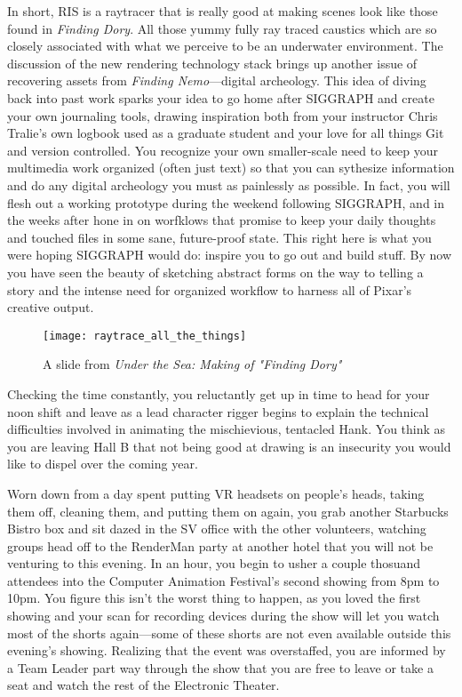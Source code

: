 \documentclass[../main.tex]{subfiles}
\begin{document}
In short, RIS is a raytracer that is really good at making scenes look like those found in \textit{Finding Dory}. All those yummy fully ray traced caustics which are so closely associated with what we perceive to be an underwater environment. The discussion of the new rendering technology stack brings up another issue of recovering assets from \textit{Finding Nemo}---digital archeology. This idea of diving back into past work sparks your idea to go home after SIGGRAPH and create your own journaling tools, drawing inspiration both from your instructor Chris Tralie's own logbook used as a graduate student and your love for all things Git and version controlled. You recognize your own smaller-scale need to keep your multimedia work organized (often just text) so that you can sythesize information and do any digital archeology you must as painlessly as possible. In fact, you will flesh out a working prototype during the weekend following SIGGRAPH, and in the weeks after hone in on worfklows that promise to keep your daily thoughts and touched files in some sane, future-proof state. This right here is what you were hoping SIGGRAPH would do: inspire you to go out and build stuff. By now you have seen the beauty of sketching abstract forms on the way to telling a story and the intense need for organized workflow to harness all of Pixar's creative output.

\begin{figure}[h!]
	\centering
	\texttt{[image: raytrace\_all\_the\_things]}
	\caption*{A slide from \textit{Under the Sea: Making of "Finding Dory"}}
\end{figure}

Checking the time constantly, you reluctantly get up in time to head for your noon shift and leave as a lead character rigger begins to explain the technical difficulties involved in animating the mischievious, tentacled Hank. You think as you are leaving Hall B that not being good at drawing is an insecurity you would like to dispel over the coming year.

Worn down from a day spent putting VR headsets on people's heads, taking them off, cleaning them, and putting them on again, you grab another Starbucks Bistro box and sit dazed in the SV office with the other volunteers, watching groups head off to the RenderMan party at another hotel that you will not be venturing to this evening. In an hour, you begin to usher a couple thosuand attendees into the Computer Animation Festival's second showing from 8pm to 10pm. You figure this isn't the worst thing to happen, as you loved the first showing and your scan for recording devices during the show will let you watch most of the shorts again---some of these shorts are not even available outside this evening's showing. Realizing that the event was overstaffed, you are informed by a Team Leader part way through the show that you are free to leave or take a seat and watch the rest of the Electronic Theater.
\end{document}
